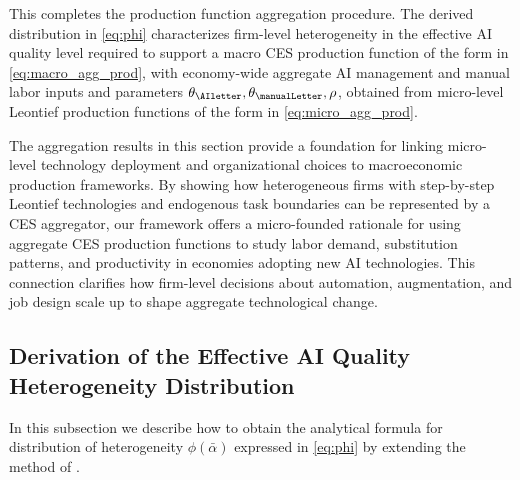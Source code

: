 This completes the production function aggregation procedure.
The derived distribution in \eqref{eq:phi} characterizes firm-level heterogeneity in the effective AI quality level required to support a macro CES production function of the form in \eqref{eq:macro_agg_prod}, with economy-wide aggregate AI management and manual labor inputs and parameters $\theta_{\AIletter}, \theta_{\manualLetter}, \rho$, obtained from micro-level Leontief production functions of the form in \eqref{eq:micro_agg_prod}.


The aggregation results in this section provide a foundation for linking micro-level technology deployment and organizational choices to macroeconomic production frameworks.
By showing how heterogeneous firms with step-by-step Leontief technologies and endogenous task boundaries can be represented by a CES aggregator, our framework offers a micro-founded rationale for using aggregate CES production functions to study labor demand, substitution patterns, and productivity in economies adopting new AI technologies.
This connection clarifies how firm-level decisions about automation, augmentation, and job design scale up to shape aggregate technological change.



\subsection{Derivation of the Effective AI Quality Heterogeneity Distribution}
\label{sec:aggregationDist}

In this subsection we describe how to obtain the analytical formula for distribution of heterogeneity $\phi(\bar{\alpha})$ expressed in \eqref{eq:phi} by extending the method of \cite{levhari1968note}.

